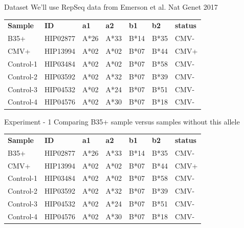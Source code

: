 \documentclass[12pt]{beamer}
\begin{document}
\begin{frame}{Dataset}
We'll use RepSeq data from Emerson et al. Nat Genet 2017
\begin{table}[]
\begin{tabular}{lllllll}
\textbf{Sample} & \textbf{ID} & \textbf{a1} & \textbf{a2} & \textbf{b1} & \textbf{b2} & \textbf{status} \\
B35+            & HIP02877    & A*26        & A*33        & B*14        & B*35        & CMV-            \\
CMV+            & HIP13994    & A*02        & A*02        & B*07        & B*44        & CMV+            \\
Control-1       & HIP03484    & A*02        & A*02        & B*07        & B*58        & CMV-            \\
Control-2       & HIP03592    & A*02        & A*32        & B*07        & B*39        & CMV-            \\
Control-3       & HIP04532    & A*02        & A*24        & B*07        & B*51        & CMV-            \\
Control-4       & HIP04576    & A*02        & A*30        & B*07        & B*18        & CMV-           
\end{tabular}
\end{table}
\end{frame}

\begin{frame}{Experiment - 1}
Comparing B35+ sample versus samples without this allele
\begin{table}[]
\begin{tabular}{lllllll}
\textbf{Sample} & \textbf{ID} & \textbf{a1} & \textbf{a2} & \textbf{b1}                  & \textbf{b2}                  & \textbf{status} \\
B35+            & HIP02877    & A*26        & A*33        & B*14                         & \cellcolor[HTML]{FFC702}B*35 & CMV-            \\
CMV+            & HIP13994    & A*02        & A*02        & B*07                         & B*44                         & CMV+            \\
Control-1       & HIP03484    & A*02        & A*02        & \cellcolor[HTML]{9698ED}B*07 & \cellcolor[HTML]{9698ED}B*58 & CMV-            \\
Control-2       & HIP03592    & A*02        & A*32        & \cellcolor[HTML]{9698ED}B*07 & \cellcolor[HTML]{9698ED}B*39 & CMV-            \\
Control-3       & HIP04532    & A*02        & A*24        & \cellcolor[HTML]{9698ED}B*07 & \cellcolor[HTML]{9698ED}B*51 & CMV-            \\
Control-4       & HIP04576    & A*02        & A*30        & \cellcolor[HTML]{9698ED}B*07 & \cellcolor[HTML]{9698ED}B*18 & CMV-           
\end{tabular}
\end{table}
\end{frame}
\end{document}
